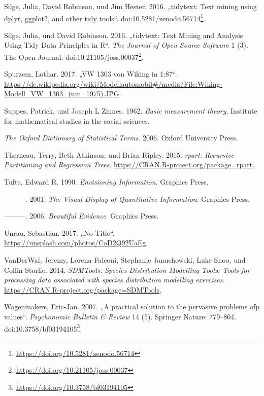 \documentclass[12pt,ngerman,]{book}
\let\rmarkdownfootnote\footnote%
\def\footnote{\protect\rmarkdownfootnote}
\renewcommand{\href}[2]{#2\footnote{\url{#1}}}
\theoremstyle{definition}
\theoremstyle{definition}
\theoremstyle{remark}
\begin{document}
\hypertarget{ref-tidytext-archive}{}
Silge, Julia, David Robinson, und Jim Hester. 2016. „tidytext: Text
mining using dplyr, ggplot2, and other tidy tools``.
doi:\href{https://doi.org/10.5281/zenodo.56714}{10.5281/zenodo.56714}.

\hypertarget{ref-Silge2016}{}
Silge, Julia, und David Robinson. 2016. „tidytext: Text Mining and
Analysis Using Tidy Data Principles in R``. \emph{The Journal of Open
Source Software} 1 (3). The Open Journal.
doi:\href{https://doi.org/10.21105/joss.00037}{10.21105/joss.00037}.

\hypertarget{ref-spurzem_vw_2017}{}
Spurzem, Lothar. 2017. „VW 1303 von Wiking in 1:87``.
\url{https://de.wikipedia.org/wiki/Modellautomobil\#/media/File:Wiking-Modell_VW_1303_(um_1975).JPG}.

\hypertarget{ref-suppes1962basic}{}
Suppes, Patrick, und Joseph L Zinnes. 1962. \emph{Basic measurement
theory}. Institute for mathematical studies in the social sciences.

\hypertarget{ref-oxford}{}
\emph{The Oxford Dictionary of Statistical Terms}. 2006. Oxford
University Press.

\hypertarget{ref-R-rpart}{}
Therneau, Terry, Beth Atkinson, und Brian Ripley. 2015. \emph{rpart:
Recursive Partitioning and Regression Trees}.
\url{https://CRAN.R-project.org/package=rpart}.

\hypertarget{ref-1930824149}{}
Tufte, Edward R. 1990. \emph{Envisioning Information}. Graphics Press.

\hypertarget{ref-1930824130}{}
---------. 2001. \emph{The Visual Display of Quantitative Information}.
Graphics Press.

\hypertarget{ref-1930824165}{}
---------. 2006. \emph{Beautiful Evidence}. Graphics Press.

\hypertarget{ref-unrau1}{}
Unrau, Sebastian. 2017. „No Title``.
\url{https://unsplash.com/photos/CoD2Q92UaEg}.

\hypertarget{ref-R-SDMTools}{}
VanDerWal, Jeremy, Lorena Falconi, Stephanie Januchowski, Luke Shoo, und
Collin Storlie. 2014. \emph{SDMTools: Species Distribution Modelling
Tools: Tools for processing data associated with species distribution
modelling exercises}. \url{https://CRAN.R-project.org/package=SDMTools}.

\hypertarget{ref-Wagenmakers2007}{}
Wagenmakers, Eric-Jan. 2007. „A practical solution to the pervasive
problems ofp values``. \emph{Psychonomic Bulletin \& Review} 14 (5).
Springer Nature: 779--804.
doi:\href{https://doi.org/10.3758/bf03194105}{10.3758/bf03194105}.
\end{document}
